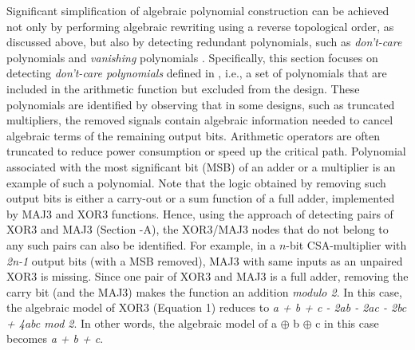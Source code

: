 Significant simplification of algebraic polynomial construction can be achieved not only by performing algebraic rewriting using a {\color{red}reverse topological order}, as discussed above, but also by detecting redundant polynomials, {\color{red}such as \textit{don't-care} polynomials and \textit{vanishing} polynomials \cite{sayedformal:date-2016}\cite{yu-isvlsi-16a}. Specifically, this section focuses on detecting \textit{don't-care polynomials} defined in \cite{yu-isvlsi-16a}, i.e., a set of polynomials that are included in the arithmetic function but excluded from the design.} %
%
{\color{red}These polynomials are identified by observing that in some designs, such as truncated multipliers, the removed signals contain algebraic information needed to cancel algebraic terms of the remaining output bits. Arithmetic operators are often truncated to reduce power consumption or speed up the critical path. Polynomial associated with the most significant bit (MSB) of an adder or a multiplier is an example of such a polynomial.}
Note that the logic obtained by removing such output bits is either a carry-out or a sum function of a full adder, implemented by MAJ3 and XOR3 functions. Hence, using the approach of detecting pairs of XOR3 and MAJ3 (Section -A), the XOR3/MAJ3 nodes that do not belong to any such pairs can also be identified. For example, in a $n$-bit CSA-multiplier with \textit{2n-1} output bits (with a MSB removed), MAJ3 with same inputs as an unpaired XOR3 is missing. Since one pair of XOR3 and MAJ3 is a full adder, removing the carry bit (and the MAJ3) makes the function an addition \textit{modulo 2}. In this case, the algebraic model of XOR3 (Equation 1) reduces to {\color{red}\textit{a + b + c - 2ab - 2ac - 2bc + 4abc mod 2}. In other words, the algebraic model of a $\oplus$ b $\oplus$ c in this case becomes \textit{a + b + c}}.
